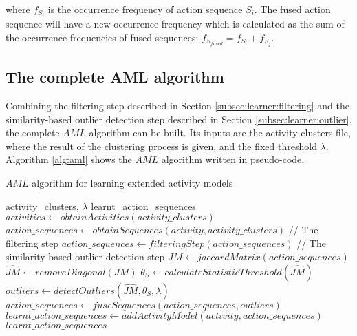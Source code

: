 \noindent where $f_{S_i}$ is the occurrence frequency of action sequence $S_i$. The fused action sequence will have a new occurrence frequency which is calculated as the sum of the occurrence frequencies of fused sequences: $f_{S_{fused}} = f_{S_i} + f_{S_j}$. 

\subsection{The complete AML algorithm}
\label{subsec:learner:complete}

Combining the filtering step described in Section \ref{subsec:learner:filtering} and the similarity-based outlier detection step described in Section \ref{subsec:learner:outlier}, the complete $AML$ algorithm can be built. Its inputs are the activity clusters file, where the result of the clustering process is given, and the fixed threshold $\lambda$. Algorithm \ref{alg:aml} shows the $AML$ algorithm written in pseudo-code.  

\begin{algorithm}
 \caption{$AML$ algorithm for learning extended activity models}
 \label{alg:aml}
 \begin{algorithmic}
 \REQUIRE activity\_clusters, $\lambda$
 \ENSURE learnt\_action\_sequences
 \STATE $activities \leftarrow obtainActivities(activity\_clusters)$
   \STATE $action\_sequences \leftarrow obtainSequences(activity, activity\_clusters)$
   \STATE // The filtering step
   \STATE $action\_sequences \leftarrow filteringStep(action\_sequences)$
   \STATE // The similarity-based outlier detection step
   \REPEAT
     \STATE $JM \leftarrow jaccardMatrix(action\_sequences)$
     \STATE $\hat{JM} \leftarrow removeDiagonal(JM)$
     \STATE $\theta_S \leftarrow calculateStatisticThreshold(\hat{JM})$
     \STATE $outliers \leftarrow detectOutliers(\hat{JM}, \theta_S, \lambda)$
     \STATE $action\_sequences \leftarrow fuseSequences(action\_sequences, outliers)$
   \STATE $learnt\_action\_sequences \leftarrow addActivityModel(activity, action\_sequences)$
 \ENDFOR
 \RETURN $learnt\_action\_sequences$ 
 \end{algorithmic}
\end{algorithm}

